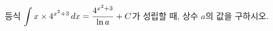 등식 $\displaystyle\int x\times 4^{x^2+3}\mkern3mu dx=\dfrac{4^{x^2+3}}{\ln a}+C$가 성립할 때, 상수 $a$의 값을 구하시오. 
